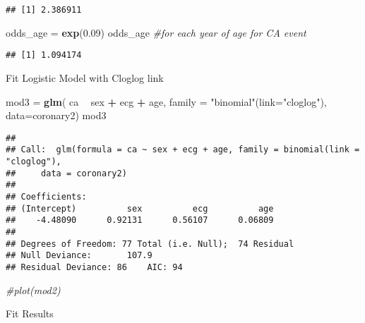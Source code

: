 \documentclass[]{article}
\newenvironment{Shaded}{\begin{snugshade}}{\end{snugshade}}
\newcommand{\KeywordTok}[1]{\textcolor[rgb]{0.13,0.29,0.53}{\textbf{#1}}}
\newcommand{\DataTypeTok}[1]{\textcolor[rgb]{0.13,0.29,0.53}{#1}}
\newcommand{\FloatTok}[1]{\textcolor[rgb]{0.00,0.00,0.81}{#1}}
\newcommand{\StringTok}[1]{\textcolor[rgb]{0.31,0.60,0.02}{#1}}
\newcommand{\CommentTok}[1]{\textcolor[rgb]{0.56,0.35,0.01}{\textit{#1}}}
\newcommand{\OperatorTok}[1]{\textcolor[rgb]{0.81,0.36,0.00}{\textbf{#1}}}
\newcommand{\NormalTok}[1]{#1}
\begin{document}
\begin{verbatim}
## [1] 2.386911
\end{verbatim}

\begin{Shaded}
\begin{Highlighting}[]
\NormalTok{odds_age =}\StringTok{ }\KeywordTok{exp}\NormalTok{(}\FloatTok{0.09}\NormalTok{)}
\NormalTok{odds_age                   }\CommentTok{#for each year of age for CA event}
\end{Highlighting}
\end{Shaded}

\begin{verbatim}
## [1] 1.094174
\end{verbatim}

Fit Logistic Model with Cloglog link

\begin{Shaded}
\begin{Highlighting}[]
\NormalTok{mod3 =}\StringTok{ }\KeywordTok{glm}\NormalTok{( ca }\OperatorTok{~}\StringTok{ }\NormalTok{sex }\OperatorTok{+}\StringTok{ }\NormalTok{ecg }\OperatorTok{+}\StringTok{ }\NormalTok{age,}
            \DataTypeTok{family =} \StringTok{"binomial"}\NormalTok{(}\DataTypeTok{link=}\StringTok{"cloglog"}\NormalTok{),}
            \DataTypeTok{data=}\NormalTok{coronary2)}
\NormalTok{mod3}
\end{Highlighting}
\end{Shaded}

\begin{verbatim}
## 
## Call:  glm(formula = ca ~ sex + ecg + age, family = binomial(link = "cloglog"), 
##     data = coronary2)
## 
## Coefficients:
## (Intercept)          sex          ecg          age  
##    -4.48090      0.92131      0.56107      0.06809  
## 
## Degrees of Freedom: 77 Total (i.e. Null);  74 Residual
## Null Deviance:       107.9 
## Residual Deviance: 86    AIC: 94
\end{verbatim}

\begin{Shaded}
\begin{Highlighting}[]
\CommentTok{#plot(mod2)}
\end{Highlighting}
\end{Shaded}

Fit Results
\end{document}
